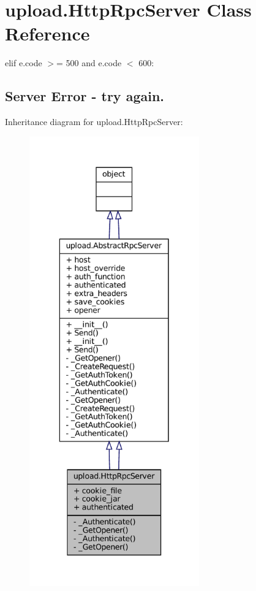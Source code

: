 \hypertarget{classupload_1_1HttpRpcServer}{}\section{upload.\+Http\+Rpc\+Server Class Reference}
\label{classupload_1_1HttpRpcServer}


elif e.\+code $>$= 500 and e.\+code $<$ 600\+: \subsection*{Server Error -\/ try again.} 




Inheritance diagram for upload.\+Http\+Rpc\+Server\+:
\nopagebreak
\begin{figure}[H]
\begin{center}
\leavevmode
\includegraphics[height=550pt]{classupload_1_1HttpRpcServer__inherit__graph}
\end{center}
\end{figure}



